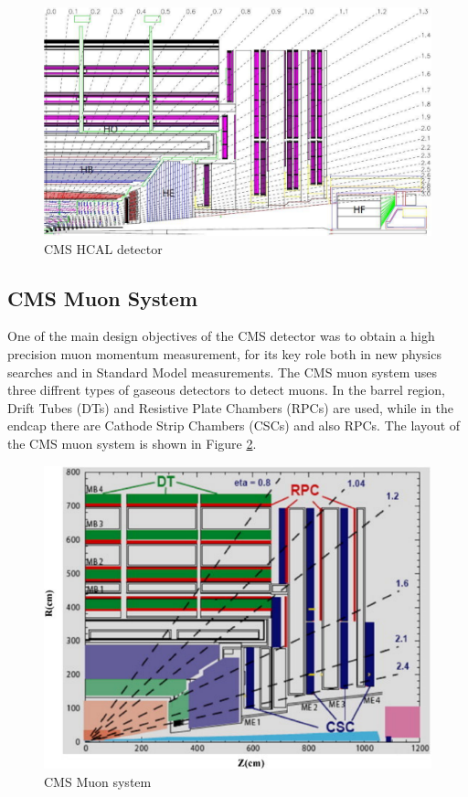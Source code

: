 \begin{figure}
  \includegraphics[width=\largefigwidth]{chap_CMSDetector_figures/cms_HCAL}
  \caption[CMS HCAL]%
  {CMS HCAL detector}
  \label{fig:CMSHCAL}
\end{figure}


\subsection{CMS Muon System}

One of the main design objectives of the CMS detector was to obtain a high precision
muon momentum measurement, for its key role both in new physics searches and
in Standard Model measurements. The CMS muon system \cite{CMSExp} uses three diffrent
types of gaseous detectors to detect muons. In the barrel region, Drift Tubes (DTs)
and Resistive Plate Chambers (RPCs) are used, while in the endcap there are Cathode
Strip Chambers (CSCs) and also RPCs. The layout of the CMS muon system is shown in 
Figure \ref{fig:CMSMuonSystem}. \\



\begin{figure}
  \includegraphics[width=\largefigwidth]{chap_CMSDetector_figures/CMSMuonSystem}
  \caption[CMS Muon system]%
  {CMS Muon system}
  \label{fig:CMSMuonSystem}
\end{figure}


